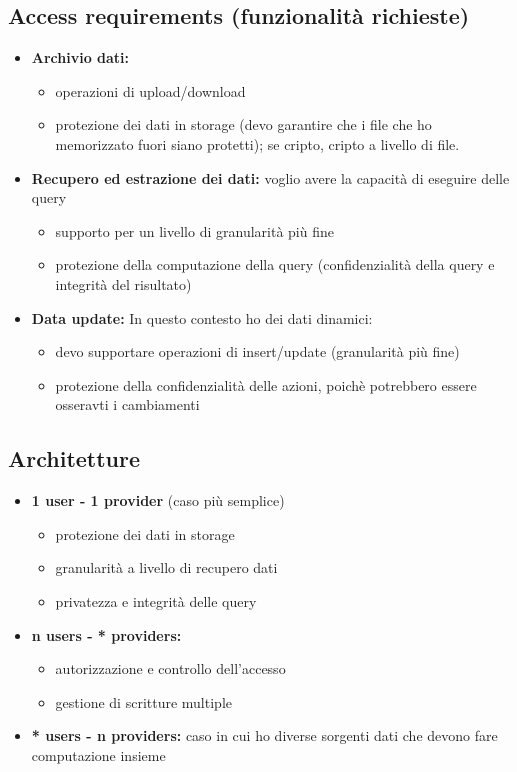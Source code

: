 \documentclass{report}
\begin{document}
\subsection{Access requirements (funzionalità richieste)}
\begin{itemize}
    \item \textbf{Archivio dati:}
    \begin{itemize}
        \item operazioni di upload/download
        \item protezione dei dati in storage (devo garantire che i file che ho memorizzato fuori siano protetti);
        se cripto, cripto a livello di file.
    \end{itemize}
    \item \textbf{Recupero ed estrazione dei dati:}
    voglio avere la capacità di eseguire delle query
    \begin{itemize}
        \item supporto per un livello di granularità più fine
        \item protezione della computazione della query (confidenzialità della query e integrità del risultato)
    \end{itemize}
    \item \textbf{Data update:}
    In questo contesto ho dei dati dinamici: 
    \begin{itemize}
        \item devo supportare operazioni di insert/update (granularità più fine)
        \item protezione della confidenzialità delle azioni, poichè potrebbero essere osseravti i cambiamenti
    \end{itemize}
\end{itemize}

\subsection{Architetture}

\begin{itemize}
    \item \textbf{1 user - 1 provider} (caso più semplice)
    \begin{itemize}
        \item protezione dei dati in storage
        \item granularità a livello di recupero dati
        \item privatezza e integrità delle query
    \end{itemize}
    \item \textbf{n users - * providers:}
    \begin{itemize}
        \item autorizzazione e controllo dell'accesso
        \item gestione di scritture multiple
    \end{itemize}
    \item \textbf{* users - n providers:} caso in cui ho diverse sorgenti dati che devono fare computazione insieme
\end{itemize}
\end{document}
